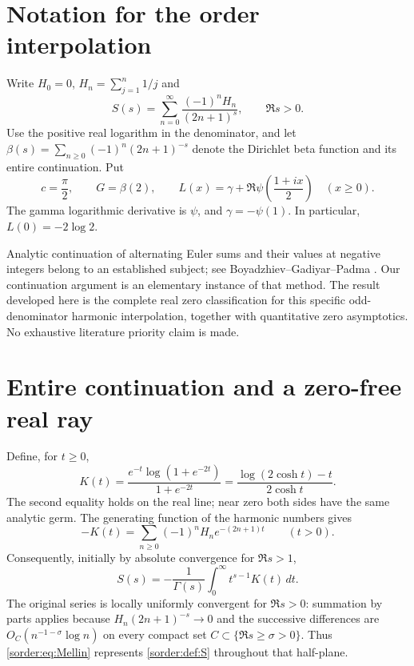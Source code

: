 \section{Notation for the order interpolation}
\label{sec:order-notation}

Write $H_0=0$, $H_n=\sum_{j=1}^n1/j$ and
\begin{equation}\label{sorder:def:S}
 S(s)=\sum_{n=0}^{\infty}\frac{(-1)^nH_n}{(2n+1)^s},\qquad \Re s>0.
\end{equation}
Use the positive real logarithm in the denominator, and let
$\beta(s)=\sum_{n\ge0}(-1)^n(2n+1)^{-s}$ denote the Dirichlet beta
function and its entire continuation. Put
\[
 c=\frac\pi2,\qquad G=\beta(2),\qquad
 L(x)=\gamma+\Re\psi\left(\frac{1+ix}{2}\right)\quad(x\ge0).
\]
The gamma logarithmic derivative is $\psi$, and $\gamma=-\psi(1)$.
In particular, $L(0)=-2\log2$.

Analytic continuation of alternating Euler sums and their values at
negative integers belong to an established subject; see
Boyadzhiev--Gadiyar--Padma \cite{BGP}. Our continuation argument is an
elementary instance of that method. The result developed here is the
complete real zero classification for this specific odd-denominator
harmonic interpolation, together with quantitative zero asymptotics.
No exhaustive literature priority claim is made.

\section{Entire continuation and a zero-free real ray}

Define, for $t\ge0$,
\begin{equation}\label{sorder:def:K}
 K(t)=\frac{e^{-t}\log(1+e^{-2t})}{1+e^{-2t}}
     =\frac{\log(2\cosh t)-t}{2\cosh t}.
\end{equation}
The second equality holds on the real line; near zero both sides have
the same analytic germ. The generating function of the harmonic
numbers gives
\[
 -K(t)=\sum_{n\ge0}(-1)^nH_n e^{-(2n+1)t}\qquad(t>0).
\]
Consequently, initially by absolute convergence for $\Re s>1$,
\begin{equation}\label{sorder:eq:Mellin}
 S(s)=-\frac1{\Gamma(s)}\int_0^\infty t^{s-1}K(t)\,dt.
\end{equation}
The original series is locally uniformly convergent for $\Re s>0$:
summation by parts applies because $H_n(2n+1)^{-s}\to0$ and the
successive differences are $O_C(n^{-1-\sigma}\log n)$ on every compact
set $C\subset\{\Re s\ge\sigma>0\}$. Thus \eqref{sorder:eq:Mellin}
represents \eqref{sorder:def:S} throughout that half-plane.

